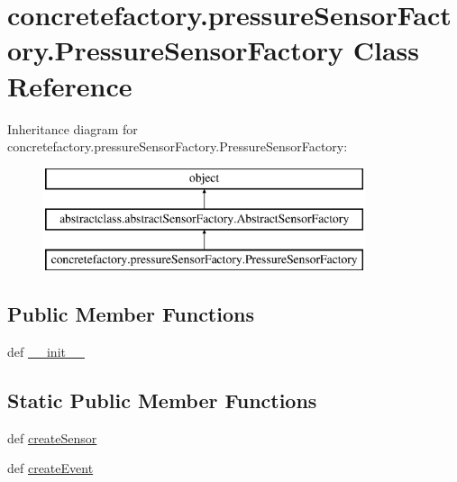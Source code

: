 \hypertarget{classconcretefactory_1_1pressureSensorFactory_1_1PressureSensorFactory}{}\section{concretefactory.\+pressure\+Sensor\+Factory.\+Pressure\+Sensor\+Factory Class Reference}
\label{classconcretefactory_1_1pressureSensorFactory_1_1PressureSensorFactory}
Inheritance diagram for concretefactory.\+pressure\+Sensor\+Factory.\+Pressure\+Sensor\+Factory\+:\begin{figure}[H]
\begin{center}
\leavevmode
\includegraphics[height=3.000000cm]{classconcretefactory_1_1pressureSensorFactory_1_1PressureSensorFactory}
\end{center}
\end{figure}
\subsection*{Public Member Functions}
\begin{DoxyCompactItemize}
\item 
def \hyperlink{classconcretefactory_1_1pressureSensorFactory_1_1PressureSensorFactory_aa6217250412bb02851deecb1c0844e3c}{\+\_\+\+\_\+init\+\_\+\+\_\+}
\end{DoxyCompactItemize}
\subsection*{Static Public Member Functions}
\begin{DoxyCompactItemize}
\item 
def \hyperlink{classconcretefactory_1_1pressureSensorFactory_1_1PressureSensorFactory_ace7ec33119f657b5239aae933dbd91bf}{create\+Sensor}
\item 
def \hyperlink{classconcretefactory_1_1pressureSensorFactory_1_1PressureSensorFactory_a5a933774a616f4c1b1ad7fd5d3a406f6}{create\+Event}
\end{DoxyCompactItemize}


